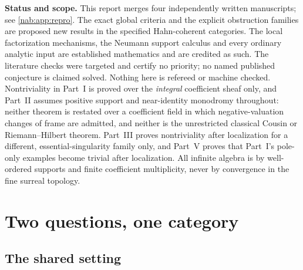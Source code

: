 \documentclass[11pt,letterpaper]{article}
\theoremstyle{definition}
\theoremstyle{remark}
\numberwithin{equation}{section}
\begin{document}
\begin{titlepage}
\begin{minipage}{0.94\textwidth}
\begin{abstract}
\medskip
\noindent\textbf{The two headline criteria are different criteria on
different objects.} Part~I tests the supports of normalized polar factors, not
the raw transition supports; Part~II tests the raw meridian monodromy
supports.  states which object each is a criterion
on, and \cref{nab:sec:rankthree} contains the example that makes the
distinction unavoidable.
\end{abstract}
\end{minipage}
\vfill
\begin{minipage}{0.94\textwidth}\small
\textbf{Status and scope.} This report merges four independently written
manuscripts; see \cref{nab:app:repro}. The exact global criteria and the
explicit obstruction families are proposed new results in the specified
Hahn-coherent categories. The local factorization mechanisms, the Neumann
support calculus and every ordinary analytic input are established
mathematics and are credited as such. The literature checks were targeted and
certify no priority; no named published conjecture is claimed solved. Nothing
here is refereed or machine checked. Nontriviality in Part~I is proved over
the \emph{integral} coefficient sheaf only, and Part~II assumes positive
support and near-identity monodromy throughout: neither theorem is restated
over a coefficient field in which negative-valuation changes of frame are
admitted, and neither is the unrestricted classical Cousin or
Riemann--Hilbert theorem. Part~III proves nontriviality after localization
for a different, essential-singularity family only, and Part~V proves that
Part~I's pole-only examples become trivial after localization. All infinite
algebra is by well-ordered supports and
finite coefficient multiplicity, never by convergence in the fine surreal
topology.
\end{minipage}
\end{titlepage}
\hypersetup{pageanchor=true}
\tableofcontents
\newpage
{}

\section{Two questions, one category}\label{nab:sec:intro}

\subsection{The shared setting}
\end{document}
